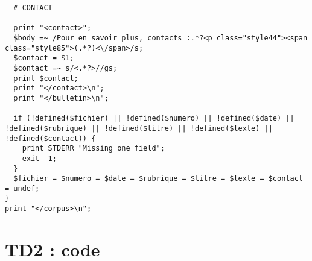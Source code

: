 \begin{lstlisting}
  # CONTACT

  print "<contact>";
  $body =~ /Pour en savoir plus, contacts :.*?<p class="style44"><span class="style85">(.*?)<\/span>/s;
  $contact = $1;
  $contact =~ s/<.*?>//gs;
  print $contact;
  print "</contact>\n";
  print "</bulletin>\n";

  if (!defined($fichier) || !defined($numero) || !defined($date) || !defined($rubrique) || !defined($titre) || !defined($texte) || !defined($contact)) {
    print STDERR "Missing one field";
    exit -1;
  }
  $fichier = $numero = $date = $rubrique = $titre = $texte = $contact = undef;
}
print "</corpus>\n";
\end{lstlisting}

\chapter{TD2 : code}
\fakeshell
